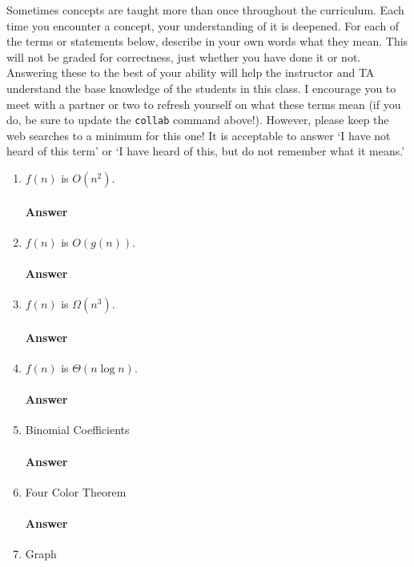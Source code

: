 \documentclass{article}
\begin{document}
Sometimes concepts are taught more than once throughout the curriculum.  Each
time you encounter a concept, your understanding of it is deepened.
For each of the terms or statements below, describe in your own words what they
mean.  This will not be graded for correctness, just whether you have done it or
not.  Answering these to the best of your ability will help the instructor and
TA understand the base knowledge of the students in this class.
I encourage you to meet with a partner or two to refresh yourself on what these
terms mean (if you do, be sure to update the \texttt{collab} command
above!).  However, please keep the web searches to a minimum for this one!  It
is acceptable to answer `I have not heard of this term' or `I have heard of
this, but do not remember what it means.'
\begin{enumerate}
    \item $f(n)$ is $O(n^2)$.
        \paragraph{Answer}
    \item $f(n)$ is $O(g(n))$.
        \paragraph{Answer}
    \item $f(n)$ is $\Omega(n^3)$.
        \paragraph{Answer}
    \item $f(n)$ is $\Theta(n\log n)$.
        \paragraph{Answer}
    \item Binomial Coefficients
        \paragraph{Answer}
    \item Four Color Theorem
        \paragraph{Answer}
    \item Graph

\end{enumerate}
\end{document}
